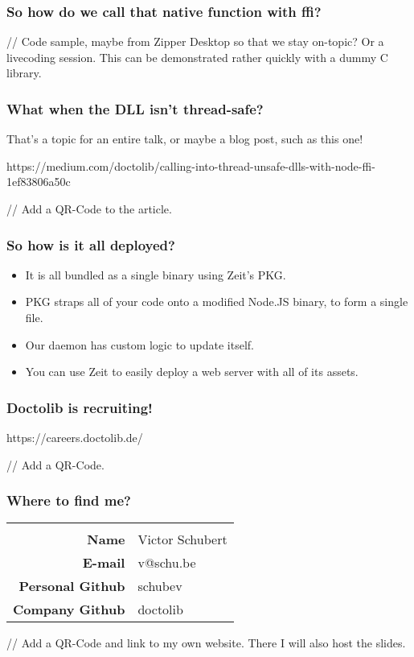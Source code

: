 \begin{frame}
	\frametitle{So how do we call that native function with ffi?}

	// Code sample, maybe from Zipper Desktop so that we stay on-topic? Or a
	livecoding session. This can be demonstrated rather quickly with a dummy C
	library.
\end{frame}

\begin{frame}
	\frametitle{What when the DLL isn’t thread-safe?}

	That’s a topic for an entire talk, or maybe a blog post, such as this one!

	https://medium.com/doctolib/calling-into-thread-unsafe-dlls-with-node-ffi-1ef83806a50c

	// Add a QR-Code to the article.
\end{frame}

\begin{frame}
	\frametitle{So how is it all deployed?}

	\begin{itemize}
		\item It is all bundled as a single binary using Zeit’s PKG.
		\item PKG straps all of your code onto a modified Node.JS binary, to form
			a single file.
		\item Our daemon has custom logic to update itself.
		\item You can use Zeit to easily deploy a web server with all of its
			assets.
	\end{itemize}
\end{frame}

\begin{frame}
	\frametitle{Doctolib is recruiting!}

	\centering

	https://careers.doctolib.de/

	// Add a QR-Code.
\end{frame}

\begin{frame}
	\frametitle{Where to find me?}

	\centering

	\begin{tabular}{>{\bfseries}rl}
		\hspace{0.5\textwidth}&\hspace{0.5\textwidth}\\
		Name & Victor Schubert \\
		E-mail & v@schu.be \\
		Personal Github & schubev \\
		Company Github & doctolib \\
	\end{tabular}

	\vspace{1em}
	// Add a QR-Code and link to my own website. There I will also host the
	slides.
\end{frame}
